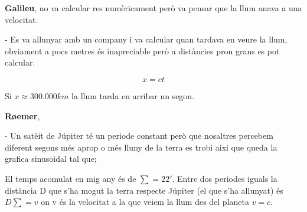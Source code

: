 \documentclass[12pt]{article}
\begin{document}
\begin{tcolorbox}[
    colback=white,      
    colframe=black,    
    coltext=black,     
    boxrule=1pt,        
    arc=0pt 
  ]           
  \textbf{Galileu}, no va calcular res numèricament però va pensar que la llum anava a una velocitat.

  - Es va allunyar amb un company i va calcular quan tardava en veure la llum, obviament a pocs metres és inapreciable però a distàncies prou grans es pot calcular.

  \[x = ct\]

  Si $x \approx 300.000 km$ la llum tarda en arribar un segon.

\end{tcolorbox}
\begin{tcolorbox}[
    colback=white,      
    colframe=black,    
    coltext=black,     
    boxrule=1pt,        
    arc=0pt 
  ]           

  \textbf{Røemer},

  - Un satèit de Júpiter té un periode constant però que nosaltres percebem diferent segons més aprop o més lluny de la terra es trobi aixi que queda la grafica sinusoidal tal que;
  
  El temps acomulat en mig any és de $\sum = 22'$. Entre dos periodes iguals la distància D que s'ha mogut la terra respecte Júpiter (el que s'ha allunyat) és $D \sum = v$ on v és la velocitat a la que veiem la llum des del planeta $v=c$.

\end{tcolorbox}
\end{document}

